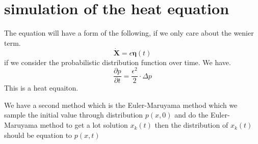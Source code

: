 \documentclass{article}
\theoremstyle{definition} %
\begin{document}
\section{simulation of the heat equation}
The equation will have a form of the following,
if we only care about the wenier term.
\[
    \dot{\mathbf{X}} =  \epsilon\boldsymbol{\eta}(t)
\]
if we consider the probabilistic distribution function
over time. We have.
\[
    \frac{\partial p}{\partial t} = \frac{\epsilon^2}{2} \cdot \Delta p
\]
This is a heat equaiton.

We have a second method which is the
Euler-Maruyama method which we sample
the initial value through distribution
\(p(x,0)\) and do the Euler-Maruyama
method to get a lot solution
\(x_k(t)\) then the distribution of
\(x_k(t)\) should be equation to
\(p(x,t)\)









\end{document}
